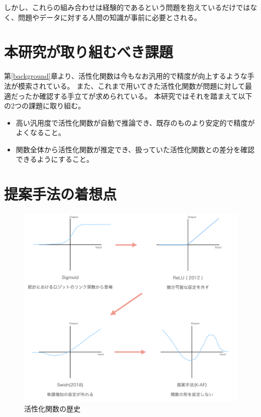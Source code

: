 しかし、これらの組み合わせは経験的であるという問題を抱えているだけではなく、問題やデータに対する人間の知識が事前に必要とされる。


\section{本研究が取り組むべき課題}
\label{honkadai}

第\ref{background}章より、活性化関数は今もなお汎用的で精度が向上するような手法が模索されている。
また、これまで用いてきた活性化関数が問題に対して最適だったか確認する手立てが求められている。
本研究ではそれを踏まえて以下の2つの課題に取り組む。

\begin{itemize}
  \item 高い汎用度で活性化関数が自動で推論でき、既存のものより安定的で精度がよくなること。
  \item 関数全体から活性化関数が推定でき、扱っていた活性化関数との差分を確認できるようにすること。
\end{itemize}


\section{提案手法の着想点}
\label{history_activation}

\begin{figure}[hbtp]
\includegraphics[width=15cm]{asset/history_af.png}
	\caption{活性化関数の歴史}
	\label{history_af}
\end{figure}


